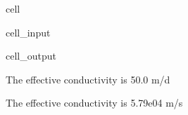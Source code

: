 \documentclass[letterpaper,10pt,english]{jupyterBook}
\begin{document}
\begin{sphinxuseclass}{cell}
\begin{sphinxVerbatimInput}
\begin{sphinxuseclass}{cell_input}
\end{sphinxuseclass}\end{sphinxVerbatimInput}
\begin{sphinxVerbatimOutput}

\begin{sphinxuseclass}{cell_output}
\begin{sphinxVerbatim}[commandchars=\\\{\}]

The effective conductivity is 50.0 m/d 

The effective conductivity is 5.79e\PYGZhy{}04 m/s
\end{sphinxVerbatim}

\end{sphinxuseclass}\end{sphinxVerbatimOutput}

\end{sphinxuseclass}
\end{document}

